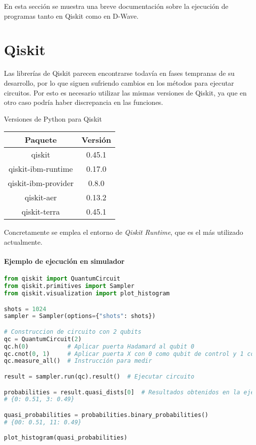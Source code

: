 En esta sección se muestra una breve documentación sobre la ejecución de programas tanto en Qiskit como en D-Wave.

\section{Qiskit}

Las librerías de Qiskit parecen encontrarse todavía en fases tempranas de su desarrollo, por lo que siguen sufriendo cambios en los métodos para ejecutar circuitos.
Por esto es necesario utilizar las mismas versiones de Qiskit, ya que en otro caso podría haber discrepancia en las funciones.

\begin{table}{}{Versiones de Python para Qiskit}
  \centering
  \begin{tabular}{|c|c|}
    \hline
    \textbf{Paquete}    & \textbf{Versión} \\ \hline
    qiskit              & 0.45.1           \\
    qiskit-ibm-runtime  & 0.17.0           \\
    qiskit-ibm-provider & 0.8.0            \\
    qiskit-aer          & 0.13.2           \\
    qiskit-terra        & 0.45.1           \\
    \hline
  \end{tabular}
\end{table}

Concretamente se emplea el entorno de \textit{Qiskit Runtime}, que es el más utilizado actualmente.

\paragraph{Ejemplo de ejecución en simulador}

\begin{lstlisting}[language=Python,label=cod:8-ejecucion_qiskit_simulador,caption={Ejemplo de ejecución en simulador de Qiskit},style=numbered]
from qiskit import QuantumCircuit
from qiskit.primitives import Sampler
from qiskit.visualization import plot_histogram

shots = 1024
sampler = Sampler(options={"shots": shots})

# Construccion de circuito con 2 qubits
qc = QuantumCircuit(2)
qc.h(0)           # Aplicar puerta Hadamard al qubit 0
qc.cnot(0, 1)     # Aplicar puerta X con 0 como qubit de control y 1 como objetivo
qc.measure_all()  # Instrucción para medir

result = sampler.run(qc).result()  # Ejecutar circuito

probabilities = result.quasi_dists[0]  # Resultados obtenidos en la ejecución
# {0: 0.51, 3: 0.49}

quasi_probabilities = probabilities.binary_probabilities()
# {00: 0.51, 11: 0.49}

plot_histogram(quasi_probabilities)
\end{lstlisting}

